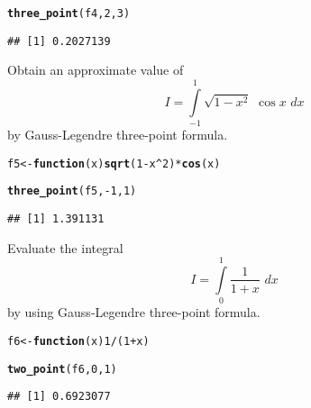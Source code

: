 \documentclass[11pt, a4paper]{article}\usepackage[]{graphicx}\usepackage[]{xcolor}
\makeatletter
\newcommand{\hlnum}[1]{\textcolor[rgb]{0.686,0.059,0.569}{#1}}%
\newcommand{\hlopt}[1]{\textcolor[rgb]{0,0,0}{#1}}%
\newcommand{\hldef}[1]{\textcolor[rgb]{0.345,0.345,0.345}{#1}}%
\newcommand{\hlkwa}[1]{\textcolor[rgb]{0.161,0.373,0.58}{\textbf{#1}}}%
\newcommand{\hlkwb}[1]{\textcolor[rgb]{0.69,0.353,0.396}{#1}}%
\newcommand{\hlkwc}[1]{\textcolor[rgb]{0.333,0.667,0.333}{#1}}%
\newcommand{\hlkwd}[1]{\textcolor[rgb]{0.737,0.353,0.396}{\textbf{#1}}}%
\newenvironment{kframe}{%
 \def\at@end@of@kframe{}%
 \ifinner\ifhmode%
  \def\at@end@of@kframe{\end{minipage}}%
  \begin{minipage}{\columnwidth}%
 \fi\fi%
 \def\FrameCommand##1{\hskip\@totalleftmargin \hskip-\fboxsep
 \colorbox{shadecolor}{##1}\hskip-\fboxsep
     \hskip-\linewidth \hskip-\@totalleftmargin \hskip\columnwidth}%
 \MakeFramed {\advance\hsize-\width
   \@totalleftmargin\z@ \linewidth\hsize
   \@setminipage}}%
 {\par\unskip\endMakeFramed%
 \at@end@of@kframe}
\newenvironment{knitrout}{}{} %
\makeatother
\begin{document}
\begin{knitrout}
\color{fgcolor}\begin{kframe}
\begin{alltt}
\hlkwd{three_point}\hldef{(f4,} \hlnum{2}\hldef{,} \hlnum{3}\hldef{)}
\end{alltt}
\begin{verbatim}
## [1] 0.2027139
\end{verbatim}
\end{kframe}
\end{knitrout}

\leftpointright \hspace{0.5cm} Obtain an approximate value of $$I = \int \limits_{-1}^{1} \sqrt{1 - x^2} \,\, \cos x \,\, dx$$ by Gauss-Legendre three-point formula.

\begin{knitrout}
\color{fgcolor}\begin{kframe}
\begin{alltt}
\hldef{f5} \hlkwb{<-} \hlkwa{function}\hldef{(}\hlkwc{x}\hldef{)} \hlkwd{sqrt}\hldef{(}\hlnum{1} \hlopt{-} \hldef{x}\hlopt{^}\hlnum{2}\hldef{)} \hlopt{*} \hlkwd{cos}\hldef{(x)}

\hlkwd{three_point}\hldef{(f5,} \hlopt{-}\hlnum{1}\hldef{,} \hlnum{1}\hldef{)}
\end{alltt}
\begin{verbatim}
## [1] 1.391131
\end{verbatim}
\end{kframe}
\end{knitrout}


\leftpointright \hspace{0.5cm} Evaluate the integral $$I = \int \limits_{0}^{1} \dfrac{1}{1 + x} \,\, dx$$ by using Gauss-Legendre three-point formula.

\begin{knitrout}
\color{fgcolor}\begin{kframe}
\begin{alltt}
\hldef{f6} \hlkwb{<-} \hlkwa{function}\hldef{(}\hlkwc{x}\hldef{)} \hlnum{1} \hlopt{/} \hldef{(}\hlnum{1} \hlopt{+} \hldef{x)}

\hlkwd{two_point}\hldef{(f6,} \hlnum{0}\hldef{,} \hlnum{1}\hldef{)}
\end{alltt}
\begin{verbatim}
## [1] 0.6923077
\end{verbatim}
\end{kframe}
\end{knitrout}
\end{document}
